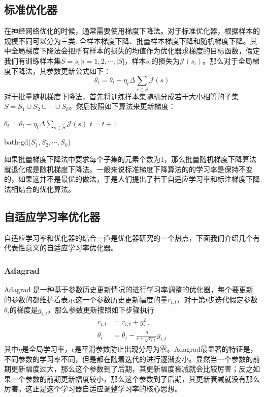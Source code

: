 \documentclass[twoside,a4paper,12pt]{book}%
\begin{document}
\subsection{标准优化器}
在神经网络优化的时候，通常需要使用梯度下降法。对于标准优化器，根据样本的规模不同可以分为三类:
全样本梯度下降、批量样本梯度下降和随机梯度下降。其中全局梯度下降法会把所有样本的损失的均值作为优化器求梯度的目标函数，假定我们有训练样本集$S={s_i|i=1,2,\cdots,|S|}$，样本$s_i$的损失为$\mathcal{J}(s_i)$。那么对于全局梯度下降法，其参数更新公式如下：
$$
\theta_t = \theta_t - \eta_t \Delta \sum_{s\in S}\mathcal{J}(s)
$$
对于批量随机梯度下降法，首先将训练样本集随机分成若干大小相等的子集$S=S_1\cup S_2 \cup \cdots \cup S_k$。然后按照如下算法来更新梯度：
\begin{algorithm}[h]
    \begin{algorithmic}[1]
    \label{algline:end} 
       \STATE $\theta_t = \theta_t - \eta_t \Delta \sum_{s\in \widetilde{S}}\mathcal{J}(s)$
       \STATE $t = t + 1$
    \ENDFOR 
    \end{algorithmic}
    \caption{bath-gd($S_1,S_2,\cdots,S_k$)}
    \label{alg:alg1}
\end{algorithm}

如果批量梯度下降法中要求每个子集的元素个数为1，那么批量随机梯度下降算法就退化成是随机梯度下降法。一般来说标准梯度下降算法的的学习率是保持不变的，如果这并不是最优的做法，于是人们提出了若干自适应学习率和标注梯度下降法相结合的优化算法。
\subsection{自适应学习率优化器}
自适应学习率和优化器的结合一直是优化器研究的一个热点，下面我们介绍几个有代表性意义的自适应学习率优化器。
\subsubsection{Adagrad}
Adagrad 是一种基于参数历史更新情况的进行学习率调整的优化器，每个要更新的参数的都维护着表示这一个参数历史更新幅度的量$r_{i,t}$，对于第$t$步迭代假定参数$\theta_i$的梯度是$g_{i,t}$，那么参数更新按照如下步骤执行
$$
\begin{aligned}
r_{i,t} &= r_{i,t} + g_{i,t}^2 \\
\theta_i &= \theta_i-\frac{\eta}{\epsilon + \sqrt{r_{i,t}}}g_{i,t}
\end{aligned}
$$
其中$\eta$是全局学习率，$\epsilon$是平滑参数防止出现分母为零。Adagrad最显著的特征是，不同参数的学习率不同，但是都在随着迭代的进行逐渐变小。显然当一个参数的前期更新幅度过大，那么这个参数到了后期，其更新幅度衰减就会比较厉害；反之如果一个参数的前期更新幅度较小，那么这个参数到了后期，其更新衰减就没有那么厉害。这正是这个学习器自适应调整学习率的核心思想。
\end{document}
